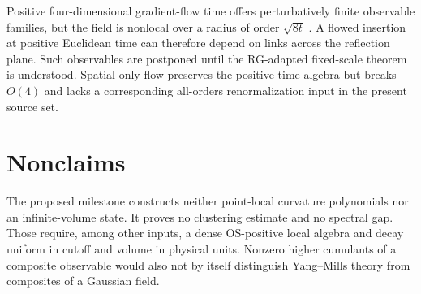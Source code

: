 \documentclass[11pt]{article}
\theoremstyle{definition}
\theoremstyle{remark}
\begin{document}
Positive four-dimensional gradient-flow time offers perturbatively finite
observable families, but the field is nonlocal over a radius of order
$\sqrt{8t}$ \cite{Luscher2010,RamosSint2016}.  A flowed insertion at positive
Euclidean time can therefore depend on links across the reflection plane.  Such
observables are postponed until the RG-adapted fixed-scale theorem is understood.
Spatial-only flow preserves the positive-time algebra but breaks $O(4)$ and lacks
a corresponding all-orders renormalization input in the present source set.

\section{Nonclaims}

The proposed milestone constructs neither point-local curvature polynomials nor
an infinite-volume state.  It proves no clustering estimate and no spectral gap.
Those require, among other inputs, a dense OS-positive local algebra and decay
uniform in cutoff and volume in physical units.  Nonzero higher cumulants of a
composite observable would also not by itself distinguish Yang--Mills theory
from composites of a Gaussian field.



\end{document}
